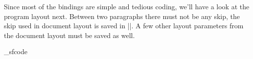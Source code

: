 \documentclass{progltx}
\begin{document}
\beginprog
\def\cwbb@cweave_bindings{%
    \ifx \cwbb@user_bindings\relax
	\cwbb@rebind
	    \cwbb@incr_indent	\1%
	    \cwbb@decr_indent	\2%
	    \cwbb@expr_break	\3%
	    \cwbb@backup	\4%
	    \cwbb@opt_break	\5%
	    \cwbb@break		\6%
	    \cwbb@big_break	\7%
	    \cwbb@noindent	\8%
	    \CwebRel		\?%
	    \CwebAddress	\AND
	    \CwebComplement	\CM
	    \CwebScope		\DC
	    \CwebEquiv		\E
	    \CwebGe		\G
	    \CwebRightShift	\GG
	    \CwebNe		\I
	    \CwebAssign		\K
	    \CwebLeftShift	\LL
	    \CwebMod		\MOD
	    \CwebNull		\NULL
	    \CwebNot		\R
	    \CwebBinOr		\OR
	    \CwebMemberRef	\PA
	    \CwebThis		\this
	    \CwebOr		\V
	    \CwebAnd		\W
	    \CwebXor		\XOR
	    \CwebLe		\Z
	    \CwebPointer	\MG
	    \CwebPointerMemberRef \MGA
	    \CwebDecr		\MM
	    \CwebIncr		\PP
	    \CwebId		\\%
	    \CwebIdLetter	\|%
	    \CwebRes		\&%
	    \CwebString		\.%
	    \CwebStringBreak	\)%
	    \CwebNumber		\T
	    \CwebCombinedOp	\MRL
	    \CwebComment	\C
	    \CwebCxxComment	\SHC
	    \CwebRefName	\X
	    \CwebMacrosHere	\ATH
	    \CwebDefine		\D
	    \cwbb@format	\F
	    \CwebIdCat		\J
	    \CwebVerbString	\vb
	    \cwbb@change_flag	\*%
	    \CwebCRAlso		\A
	    \CwebCRsAlso	\As
	    \CwebCRCite		\Q
	    \CwebCRsCite	\Qs
	    \CwebCRUse		\U
	    \CwebCRsUse		\Us
	    \CwebCREt		\ET
	    \CwebCRsEt		\ETs
	    \stop\stop
	\def\cwbb@user_bindings{%
	    \cwbb@restore_bindings
	    \let\cwbb@user_bindings\relax
	    }%
    \fi
    }
\endprog


\sect Since most of the \cweave{} bindings are simple and tedious
coding, we'll have a look at the program layout next. Between two
paragraphs there must not be any skip, the skip used in document
layout is saved in |\cwbb@save@parskip|. A few other layout
parameters from the document layout must be saved as well.

\beginprog
\newskip\cwbb@save@parskip
\newskip\cwbb@save@rightskip
\newcount\cwbb@save@sem_sfcode
\newcount\cwbb@save@pretolerance
\newcount\cwbb@save@hyphenpenalty
\newcount\cwbb@save@exhyphenpenalty

\def\cwbb@save_doc_layout{%
    \cwbb@save@parskip\parskip
    \cwbb@save@rightskip\rightskip
    \cwbb@save@sem_sfcode\sfcode`\;
    \cwbb@save@pretolerance\pretolerance
    \cwbb@save@hyphenpenalty\hyphenpenalty
    \cwbb@save@exhyphenpenalty\exhyphenpenalty
    }
\def\cwbb@restore_doc_layout{%
    \parskip\cwbb@save@parskip
    \rightskip\cwbb@save@rightskip
    \sfcode`\;=\cwbb@save@sem_sfcode
    \pretolerance\cwbb@save@pretolerance
    \hyphenpenalty\cwbb@save@hyphenpenalty
    \exhyphenpenalty\cwbb@save@exhyphenpenalty
    }
\endprog
\end{document}
